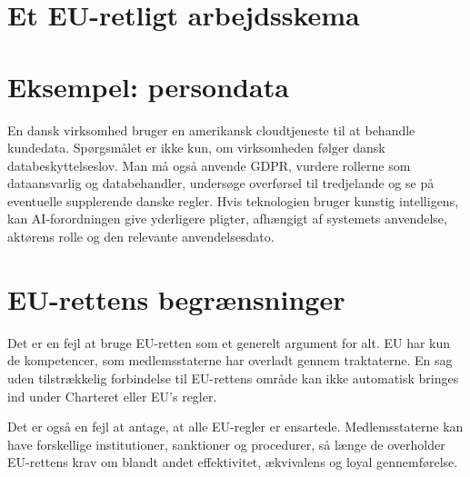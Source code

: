 \section{Et EU-retligt arbejdsskema}


\section{Eksempel: persondata}

En dansk virksomhed bruger en amerikansk cloudtjeneste til at behandle kundedata. Spørgsmålet er ikke kun, om virksomheden følger dansk databeskyttelseslov. Man må også anvende GDPR, vurdere rollerne som dataansvarlig og databehandler, undersøge overførsel til tredjelande og se på eventuelle supplerende danske regler. Hvis teknologien bruger kunstig intelligens, kan AI-forordningen give yderligere pligter, afhængigt af systemets anvendelse, aktørens rolle og den relevante anvendelsesdato.

\section{EU-rettens begrænsninger}

Det er en fejl at bruge EU-retten som et generelt argument for alt. EU har kun de kompetencer, som medlemsstaterne har overladt gennem traktaterne. En sag uden tilstrækkelig forbindelse til EU-rettens område kan ikke automatisk bringes ind under Charteret eller EU's regler.

Det er også en fejl at antage, at alle EU-regler er ensartede. Medlemsstaterne kan have forskellige institutioner, sanktioner og procedurer, så længe de overholder EU-rettens krav om blandt andet effektivitet, ækvivalens og loyal gennemførelse.


